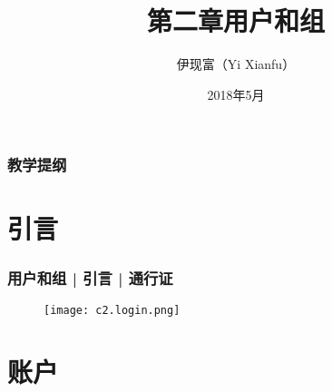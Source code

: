 



\title[用户和组]{第二章\quad 用户和组}
\author[Yixf]{伊现富（Yi Xianfu）}
\date{2018年5月}


\begin{frame}
  \titlepage
\end{frame}

\begin{frame}[plain,label=current]
  \frametitle{教学提纲}
  \setcounter{tocdepth}{3}
  \begin{multicols}{2}
    \tableofcontents
  \end{multicols}
\end{frame}

\section{引言}
\begin{frame}
  \frametitle{用户和组 | 引言 | 通行证}
  \begin{figure}
    \centering
    \texttt{[image: c2.login.png]}
  \end{figure}
\end{frame}

\section{账户}
